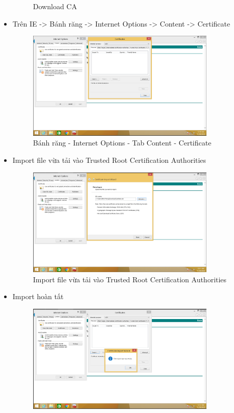 \documentclass[13pt]{report}
\begin{document}
\begin{itemize}
\begin{figure}[htp]
			\caption{Download CA}
		\end{figure}
		\newpage
		\item Trên IE -> Bánh răng -> Internet Options -> Content -> Certificate
		\begin{figure}[htp]
			\centering
			\includegraphics[width=0.85\textwidth]{image/PowerShell/Test/4.png}
			\caption{Bánh răng - Internet Options - Tab Content - Certificate}
		\end{figure}
		\item Import file vừa tải vào Trusted Root Certification Authorities
		\begin{figure}[htp]
			\centering
			\includegraphics[width=0.85\textwidth]{image/PowerShell/Test/5.png}
			\caption{Import file vừa tải vào Trusted Root Certification Authorities}
		\end{figure}
		\newpage
		\item Import hoàn tất
		\begin{figure}[htp]
			\centering
			\includegraphics[width=0.85\textwidth]{image/PowerShell/Test/6.png}

\end{figure}
\end{itemize}
\end{document}
